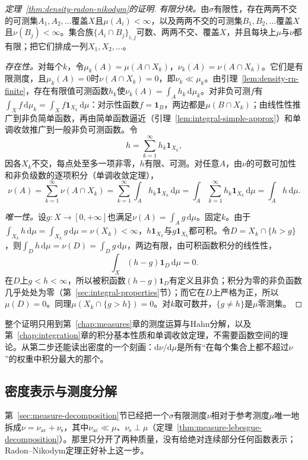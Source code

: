 \begin{proof}[定理~\ref{thm:density-radon-nikodym}的证明]
\emph{有限分块。}由$\sigma$有限性，存在两两不交的可测集$A_1,A_2,\dots$覆盖$X$且$\mu(A_i)<\infty$，以及两两不交的可测集$B_1,B_2,\dots$覆盖$X$且$\nu(B_j)<\infty$。集合族$\{A_i\cap B_j\}_{i,j}$可数、两两不交、覆盖$X$，并且每块上$\mu$与$\nu$都有限；把它们排成一列$X_1,X_2,\dots$。

\emph{存在性。}对每个$k$，令$\mu_k(A)=\mu(A\cap X_k)$，$\nu_k(A)=\nu(A\cap X_k)$。它们是有限测度，且$\mu_k(A)=0$时$\nu(A\cap X_k)=0$，即$\nu_k\ll\mu_k$。由引理~\ref{lem:density-rn-finite}，存在有限值可测函数$h_k$使$\nu_k(A)=\int_Ah_k\,\mathrm d\mu_k$。对非负可测$f$有$\int_Xf\,\mathrm d\mu_k=\int_Xf\mathbf 1_{X_k}\,\mathrm d\mu$：对示性函数$f=\mathbf 1_B$，两边都是$\mu(B\cap X_k)$；由线性性推广到非负简单函数，再由简单函数逼近（引理~\ref{lem:integral-simple-approx}）和单调收敛推广到一般非负可测函数。令
\[
 h=\sum_{k=1}^\infty h_k\mathbf 1_{X_k},
\]
因各$X_k$不交，每点处至多一项非零，$h$有限、可测。对任意$A$，由$\nu$的可数可加性和非负级数的逐项积分（单调收敛定理），
\[
 \nu(A)=\sum_{k=1}^\infty\nu(A\cap X_k)=\sum_{k=1}^\infty\int_Ah_k\mathbf 1_{X_k}\,\mathrm d\mu=\int_A\sum_{k=1}^\infty h_k\mathbf 1_{X_k}\,\mathrm d\mu=\int_Ah\,\mathrm d\mu .
\]

\emph{唯一性。}设$g:X\to[0,+\infty]$也满足$\nu(A)=\int_Ag\,\mathrm d\mu$。固定$k$。由于$\int_{X_k}h\,\mathrm d\mu=\int_{X_k}g\,\mathrm d\mu=\nu(X_k)<\infty$，$h\mathbf 1_{X_k}$与$g\mathbf 1_{X_k}$都可积。令$D=X_k\cap\{h>g\}$，则$\int_Dh\,\mathrm d\mu=\nu(D)=\int_Dg\,\mathrm d\mu$，两边有限，由可积函数积分的线性性，
\[
 \int_X(h-g)\mathbf 1_D\,\mathrm d\mu=0 .
\]
在$D$上$g<h<\infty$，所以被积函数$(h-g)\mathbf 1_D$有定义且非负；积分为零的非负函数几乎处处为零（第~\ref{sec:integral-properties}节）；而它在$D$上严格为正，所以$\mu(D)=0$。同理$\mu(X_k\cap\{g>h\})=0$。对$k$取可数并，$\{g\ne h\}$是$\mu$零测集。
\end{proof}

整个证明只用到第~\ref{chap:measures}章的测度运算与Hahn分解，以及第~\ref{chap:integration}章的积分基本性质和单调收敛定理，不需要函数空间的理论。从第二步还能读出密度的一个刻画：$\mathrm d\nu/\mathrm d\mu$是所有“在每个集合上都不超过$\nu$”的权重中积分最大的那个。

\subsection{密度表示与测度分解}
\label{sec:density-decomposition}

第~\ref{sec:measure-decomposition}节已经把一个$\sigma$有限测度$\nu$相对于参考测度$\mu$唯一地拆成$\nu=\nu_{\mathrm{ac}}+\nu_{\mathrm s}$，其中$\nu_{\mathrm{ac}}\ll\mu$、$\nu_{\mathrm s}\perp\mu$（定理~\ref{thm:measure-lebesgue-decomposition}）。那里只分开了两种质量，没有给绝对连续部分任何函数表示；Radon–Nikodym定理正好补上这一步。

